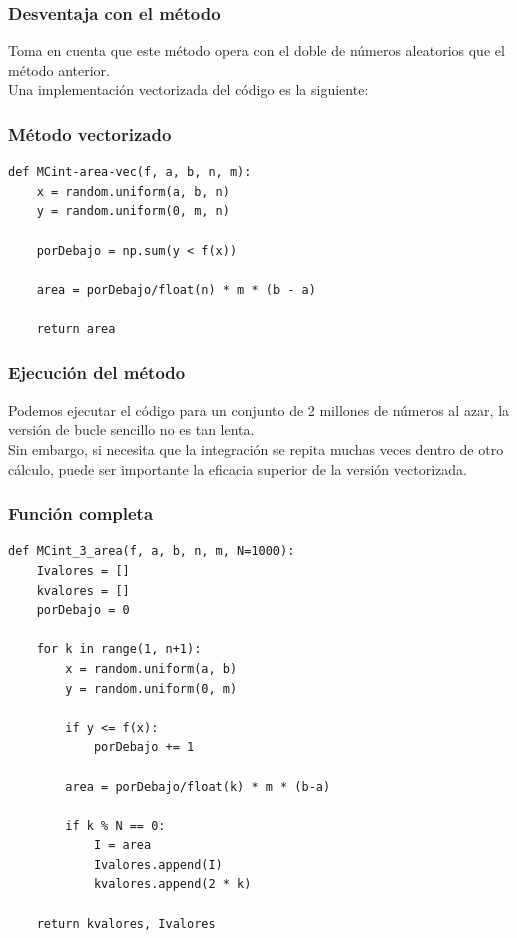 \documentclass[12pt]{beamer}
\begin{document}
\begin{frame}[fragile]
\frametitle{Desventaja con el método}
Toma en cuenta que este método opera con el doble de números aleatorios que el método anterior.
\\
\bigskip
\pause
Una implementación vectorizada del código es la siguiente:
\end{frame}
\begin{frame}[fragile]
\frametitle{Método vectorizado}
\begin{lstlisting}[caption=Método del dardo en modo vectorizado, style=FormattedNumber, basicstyle=\linespread{1.1}\ttfamily=\small, columns=fullflexible]
def MCint-area-vec(f, a, b, n, m):
    x = random.uniform(a, b, n)
    y = random.uniform(0, m, n)
    
    porDebajo = np.sum(y < f(x))
    
    area = porDebajo/float(n) * m * (b - a)
    
    return area
\end{lstlisting}
\end{frame}
\begin{frame}
\frametitle{Ejecución del método}
Podemos ejecutar el código para un conjunto de 2 millones de números al azar, la versión de bucle sencillo no es tan lenta.
\\
\bigskip
\pause
Sin embargo, si necesita que la integración se repita muchas veces dentro de otro cálculo, puede ser importante la eficacia superior de la versión vectorizada.
\end{frame}
\begin{frame}
\frametitle{Función completa}
\begin{lstlisting}[caption=Función para el método del dardo, style=FormattedNumber, basicstyle=\linespread{1.1}\ttfamily=\small, columns=fullflexible]
def MCint_3_area(f, a, b, n, m, N=1000):
    Ivalores = []
    kvalores = []
    porDebajo = 0
    
    for k in range(1, n+1):
        x = random.uniform(a, b)
        y = random.uniform(0, m)
    
        if y <= f(x):
            porDebajo += 1
    
        area = porDebajo/float(k) * m * (b-a)
    
        if k % N == 0:
            I = area
            Ivalores.append(I)
            kvalores.append(2 * k)
    
    return kvalores, Ivalores
\end{lstlisting}
\end{frame}
\end{document}
